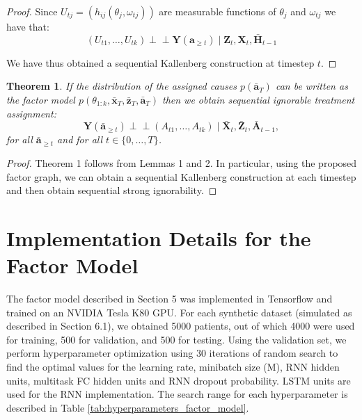 \documentclass{article}
\newtheorem{theorem}{Theorem}
\newcommand{\vc}[1]{\mathbf{#1}}
\newcommand{\ci}{\perp\!\!\!\perp}
\newcommand{\hist}[1]{\bar{\vc{#1}}}
\begin{document}
\begin{proof}
	Since $U_{tj}= (h_{ij}(\theta_j, \omega_{tj}))$ are measurable functions of $\theta_j$ and $\omega_{tj}$ we have that:
	\begin{equation}
	(U_{t1}, \dots, U_{tk}) \ci  \vc{Y}(\vc{a}_{\geq t}) \mid  \vc{Z}_t, \vc{X}_t, \hist{H}_{t-1}
	\end{equation}
	
	We have thus obtained a sequential Kallenberg construction at timestep $t$. 
	\end{proof}
	
	\begin{theorem}
	If the distribution of the assigned causes $p(\hist{a}_{T})$ can be written as the factor model $p(\theta_{1:k}, \hist{x}_T, \hist{z}_T,  \hist{a}_T)$ then we obtain \textit{sequential ignorable treatment assignment}:
	\begin{equation}
	\vc{Y}(\bar{\vc{a}}_{\geq t})  \ci (A_{t1}, \dots, A_{tk}) \mid \bar{\vc{X}}_{t}, \bar{\vc{Z}}_{t}, \bar{\vc{A}}_{t-1},  
	\end{equation}
	for all $\hist{a}_{\geq t}$ and for all $t\in \{0, \dots, T\}$. 
	\end{theorem}
	
	\begin{proof}
	Theorem 1 follows from Lemmas 1 and 2. In particular, using the proposed factor graph, we can obtain a sequential Kallenberg construction at each timestep and then obtain sequential strong ignorability. 
	\end{proof}
	
	
	\section{Implementation Details for the Factor Model} \label{apx:hyperparam}
	
	The factor model described in Section 5 was implemented in Tensorflow \citep{tensorflow2015-whitepaper} and trained on an NVIDIA Tesla K80 GPU. For each synthetic dataset (simulated as described in Section 6.1), we obtained 5000 patients, out of which 4000 were used for training, 500 for validation, and 500 for testing. Using the validation set, we perform hyperparameter optimization using 30 iterations of random search to find the optimal values for the learning rate, minibatch size (M), RNN hidden units, multitask FC hidden units and RNN dropout probability. LSTM \citep{hochreiter1997long} units are used for the RNN implementation. The search range for each hyperparameter is described in Table \ref{tab:hyperparameters_factor_model}. 
    
\end{document}
